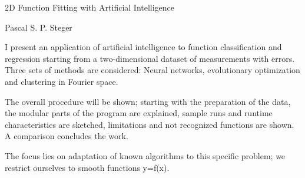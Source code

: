 2D Function Fitting with Artificial Intelligence

Pascal S. P. Steger

I present an application of artificial intelligence to function
classification and regression starting from a two-dimensional dataset
of measurements with errors. Three sets of methods are considered:
Neural networks, evolutionary optimization and clustering in Fourier space.

The overall procedure will be shown; starting with the preparation of
the data, the modular parts of the program are explained, sample runs and
runtime characteristics are sketched, limitations and not recognized
functions are shown. A comparison concludes the work.

The focus lies on adaptation of known algorithms to this specific
problem; we restrict ourselves to smooth functions y=f(x).
